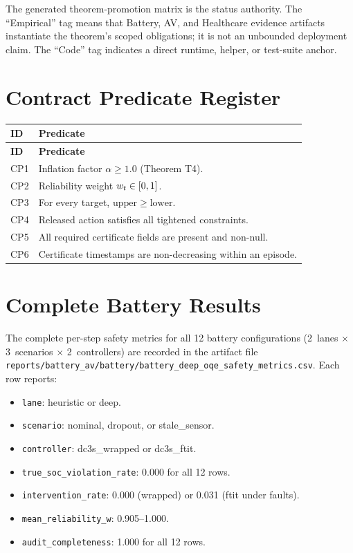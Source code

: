 The generated theorem-promotion matrix is the status authority.  The
``Empirical'' tag means that Battery, AV, and Healthcare evidence artifacts
instantiate the theorem's scoped obligations; it is not an unbounded deployment
claim.  The ``Code'' tag indicates a direct runtime, helper, or test-suite
anchor.

\section{Contract Predicate Register}\label{app:predicates}

\begin{longtable}{lp{10cm}}
\toprule
\textbf{ID} & \textbf{Predicate} \\
\midrule
\endfirsthead
\toprule
\textbf{ID} & \textbf{Predicate} \\
\midrule
\endhead
CP1 & Inflation factor $\alpha \ge 1.0$ (Theorem T4). \\
CP2 & Reliability weight $w_t \in [0, 1]$. \\
CP3 & For every target, $\mathrm{upper} \ge \mathrm{lower}$. \\
CP4 & Released action satisfies all tightened constraints. \\
CP5 & All required certificate fields are present and non-null. \\
CP6 & Certificate timestamps are non-decreasing within an episode. \\
\bottomrule
\end{longtable}

\section{Complete Battery Results}\label{app:battery_full}

The complete per-step safety metrics for all 12 battery configurations
(2~lanes $\times$ 3~scenarios $\times$ 2~controllers) are recorded in the artifact
file \texttt{reports/battery\_av/battery/battery\_deep\_oqe\_safety\_metrics.csv}.
Each row reports:
\begin{itemize}[nosep]
  \item \texttt{lane}: heuristic or deep.
  \item \texttt{scenario}: nominal, dropout, or stale\_sensor.
  \item \texttt{controller}: dc3s\_wrapped or dc3s\_ftit.
  \item \texttt{true\_soc\_violation\_rate}: 0.000 for all 12 rows.
  \item \texttt{intervention\_rate}: 0.000 (wrapped) or 0.031 (ftit under faults).
  \item \texttt{mean\_reliability\_w}: 0.905--1.000.
  \item \texttt{audit\_completeness}: 1.000 for all 12 rows.
\end{itemize}

